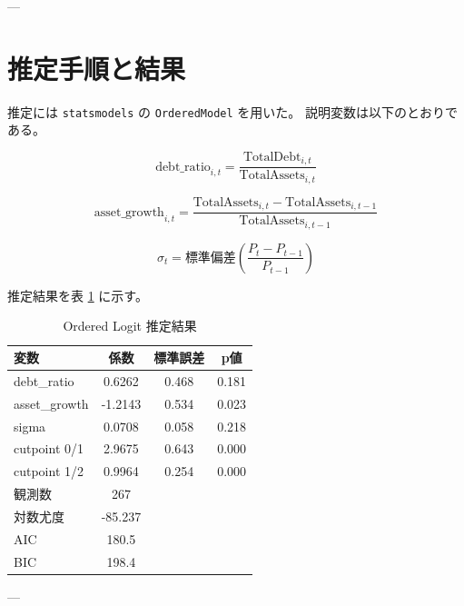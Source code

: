 ---


\section{推定手順と結果}

推定には \texttt{statsmodels} の \texttt{OrderedModel} を用いた。
説明変数は以下のとおりである。



\[
\text{debt\_ratio}_{i,t}
=
\frac{\text{TotalDebt}_{i,t}}{\text{TotalAssets}_{i,t}}
\]





\[
\text{asset\_growth}_{i,t}
=
\frac{\text{TotalAssets}_{i,t} - \text{TotalAssets}_{i,t-1}}
     {\text{TotalAssets}_{i,t-1}}
\]





\[
\sigma_t = \text{標準偏差}\left(\frac{P_t-P_{t-1}}{P_{t-1}}\right)
\]



推定結果を表 \ref{tab:ordered_logit_results} に示す。

\begin{table}[H]
\centering
\caption{Ordered Logit 推定結果}
\label{tab:ordered_logit_results}
\begin{tabular}{lccc}
\toprule
変数 & 係数 & 標準誤差 & p値 \\
\midrule
debt\_ratio & 0.6262 & 0.468 & 0.181 \\
asset\_growth & -1.2143 & 0.534 & 0.023 \\
sigma & 0.0708 & 0.058 & 0.218 \\
\midrule
cutpoint 0/1 & 2.9675 & 0.643 & 0.000 \\
cutpoint 1/2 & 0.9964 & 0.254 & 0.000 \\
\midrule
観測数 & 267 & & \\
対数尤度 & -85.237 & & \\
AIC & 180.5 & & \\
BIC & 198.4 & & \\
\bottomrule
\end{tabular}
\end{table}

---



